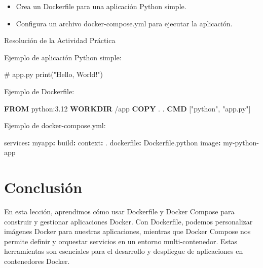 \documentclass[
  a4paper,
  DIV=11,
  numbers=noendperiod,
  onepage,
  openany]{scrreprt}
\newenvironment{Shaded}{\begin{snugshade}}{\end{snugshade}}
\newcommand{\AttributeTok}[1]{\textcolor[rgb]{0.40,0.45,0.13}{#1}}
\newcommand{\BuiltInTok}[1]{\textcolor[rgb]{0.00,0.23,0.31}{#1}}
\newcommand{\CommentTok}[1]{\textcolor[rgb]{0.37,0.37,0.37}{#1}}
\newcommand{\FunctionTok}[1]{\textcolor[rgb]{0.28,0.35,0.67}{#1}}
\newcommand{\KeywordTok}[1]{\textcolor[rgb]{0.00,0.23,0.31}{\textbf{#1}}}
\newcommand{\NormalTok}[1]{\textcolor[rgb]{0.00,0.23,0.31}{#1}}
\newcommand{\StringTok}[1]{\textcolor[rgb]{0.13,0.47,0.30}{#1}}
\providecommand{\tightlist}{%
  \setlength{\itemsep}{0pt}\setlength{\parskip}{0pt}}\usepackage{longtable,booktabs,array}
\begin{document}
\begin{itemize}
\tightlist
\item
  Crea un Dockerfile para una aplicación Python simple.
\item
  Configura un archivo docker-compose.yml para ejecutar la aplicación.
\end{itemize}

Resolución de la Actividad Práctica

Ejemplo de aplicación Python simple:

\begin{Shaded}
\begin{Highlighting}[]
\CommentTok{\# app.py}
\BuiltInTok{print}\NormalTok{(}\StringTok{"Hello, World!"}\NormalTok{)}
\end{Highlighting}
\end{Shaded}

Ejemplo de Dockerfile:

\begin{Shaded}
\begin{Highlighting}[]
\KeywordTok{FROM}\NormalTok{ python:3.12}
\KeywordTok{WORKDIR}\NormalTok{ /app}
\KeywordTok{COPY}\NormalTok{ . .}
\KeywordTok{CMD}\NormalTok{ [}\StringTok{"python"}\NormalTok{, }\StringTok{"app.py"}\NormalTok{]}
\end{Highlighting}
\end{Shaded}

Ejemplo de docker-compose.yml:

\begin{Shaded}
\begin{Highlighting}[]
\FunctionTok{services}\KeywordTok{:}
\AttributeTok{  }\FunctionTok{myapp}\KeywordTok{:}
\AttributeTok{    }\FunctionTok{build}\KeywordTok{:}
\AttributeTok{      }\FunctionTok{context}\KeywordTok{:}\AttributeTok{ .}
\AttributeTok{      }\FunctionTok{dockerfile}\KeywordTok{:}\AttributeTok{ Dockerfile.python}
\AttributeTok{    }\FunctionTok{image}\KeywordTok{:}\AttributeTok{ my{-}python{-}app}
\end{Highlighting}
\end{Shaded}

\chapter{Conclusión}\label{conclusiuxf3n-3}

En esta lección, aprendimos cómo usar Dockerfile y Docker Compose para
construir y gestionar aplicaciones Docker. Con Dockerfile, podemos
personalizar imágenes Docker para nuestras aplicaciones, mientras que
Docker Compose nos permite definir y orquestar servicios en un entorno
multi-contenedor. Estas herramientas son esenciales para el desarrollo y
despliegue de aplicaciones en contenedores Docker.
\end{document}
